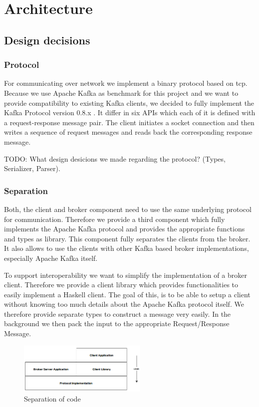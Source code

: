 \chapter{Architecture}


\section{Design decisions}
\subsection{Protocol}
For communicating over network we implement a binary protocol based on tcp.
Because we use Apache Kafka as benchmark for this project and we want to provide
compatibility to existing Kafka clients, we decided to fully implement the Kafka
Protocol version 0.8.x . It differ in six APIs which each of it is
defined with a request-response message pair. The client initiates a socket connection and then
writes a sequence of request messages and reads back the corresponding response
message. 

TODO: What design desicions we made regarding the protocol? (Types, Serializer,
Parser). 

\subsection{Separation} 
\label{sec:separation}
Both, the client and broker component need to use the same underlying protocol for
communication. Therefore we provide a third component which fully implements the Apache Kafka
protocol  and provides the appropriate functions and types as library.
This component fully separates the clients from the broker. It also allows to
use the clients with other Kafka based broker implementations, especially Apache
Kafka itself. 

To support interoperability we want to simplify the implementation of a broker
client. Therefore we provide a client library which provides functionalities to
easily implement a Haskell client. The goal of this, is to be able to
setup a client without knowing too much details about the Apache Kafka protocol
itself. We therefore provide separate types to construct a message very easily.
In the background we then pack the input to the appropriate Request/Response
Message. 

\begin{figure}[H]
    \centering
    \includegraphics[width=0.55\textwidth]{images/architecture-components.png}
    \caption{Separation of code}
    \label{fig:architecture-components.png}
\end{figure}

